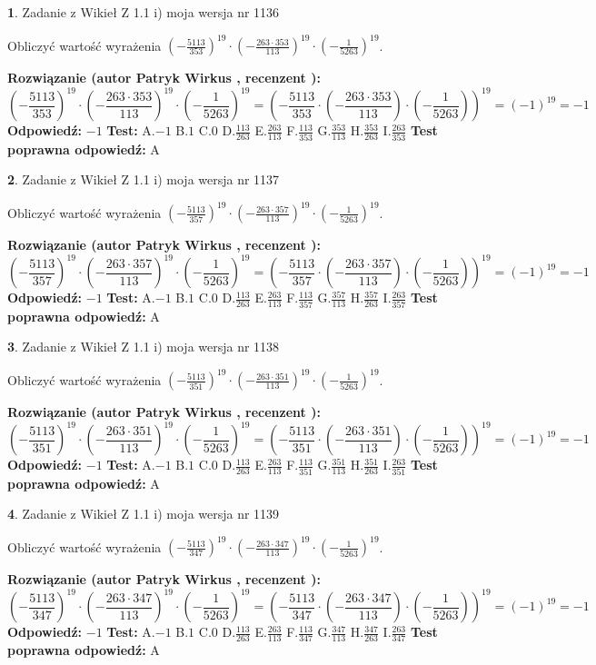 \documentclass[12pt, a4paper]{article}
\theoremstyle{definition} %
\newtheorem{zad}{}
\newcommand{\zadStart}[1]{\begin{zad}#1\newline}
\newcommand{\zadStop}{\end{zad}}
\newcommand{\rozwStart}[2]{\noindent \textbf{Rozwiązanie (autor #1 , recenzent #2): }\newline}
\newcommand{\rozwStop}{\newline}
\newcommand{\odpStart}{\noindent \textbf{Odpowiedź:}\newline}
\newcommand{\odpStop}{\newline}
\newcommand{\testStart}{\noindent \textbf{Test:}\newline}
\newcommand{\testStop}{\newline}
\newcommand{\kluczStart}{\noindent \textbf{Test poprawna odpowiedź:}\newline}
\newcommand{\kluczStop}{\newline}
\begin{document}
\zadStart{Zadanie z Wikieł Z 1.1 i) moja wersja nr 1136}

Obliczyć wartość wyrażenia $(-\frac{5113}{353})^{19} \cdot (-\frac{263 \cdot 353}{113})^{19} \cdot (-\frac{1}{5263})^{19}$.
\zadStop
\rozwStart{Patryk Wirkus}{}
$$(-\frac{5113}{353})^{19} \cdot (-\frac{263 \cdot 353}{113})^{19} \cdot (-\frac{1}{5263})^{19} = (-\frac{5113}{353} \cdot (-\frac{263 \cdot 353}{113}) \cdot (-\frac{1}{5263}))^{19} = (-1)^{19} = -1$$
\rozwStop
\odpStart
$-1$
\odpStop
\testStart
A.$-1$ B.$1$ C.$0$ D.$\frac{113}{263}$ E.$\frac{263}{113}$
F.$\frac{113}{353}$ G.$\frac{353}{113}$
H.$\frac{353}{263}$
I.$\frac{263}{353}$
\testStop
\kluczStart
A
\kluczStop



\zadStart{Zadanie z Wikieł Z 1.1 i) moja wersja nr 1137}

Obliczyć wartość wyrażenia $(-\frac{5113}{357})^{19} \cdot (-\frac{263 \cdot 357}{113})^{19} \cdot (-\frac{1}{5263})^{19}$.
\zadStop
\rozwStart{Patryk Wirkus}{}
$$(-\frac{5113}{357})^{19} \cdot (-\frac{263 \cdot 357}{113})^{19} \cdot (-\frac{1}{5263})^{19} = (-\frac{5113}{357} \cdot (-\frac{263 \cdot 357}{113}) \cdot (-\frac{1}{5263}))^{19} = (-1)^{19} = -1$$
\rozwStop
\odpStart
$-1$
\odpStop
\testStart
A.$-1$ B.$1$ C.$0$ D.$\frac{113}{263}$ E.$\frac{263}{113}$
F.$\frac{113}{357}$ G.$\frac{357}{113}$
H.$\frac{357}{263}$
I.$\frac{263}{357}$
\testStop
\kluczStart
A
\kluczStop



\zadStart{Zadanie z Wikieł Z 1.1 i) moja wersja nr 1138}

Obliczyć wartość wyrażenia $(-\frac{5113}{351})^{19} \cdot (-\frac{263 \cdot 351}{113})^{19} \cdot (-\frac{1}{5263})^{19}$.
\zadStop
\rozwStart{Patryk Wirkus}{}
$$(-\frac{5113}{351})^{19} \cdot (-\frac{263 \cdot 351}{113})^{19} \cdot (-\frac{1}{5263})^{19} = (-\frac{5113}{351} \cdot (-\frac{263 \cdot 351}{113}) \cdot (-\frac{1}{5263}))^{19} = (-1)^{19} = -1$$
\rozwStop
\odpStart
$-1$
\odpStop
\testStart
A.$-1$ B.$1$ C.$0$ D.$\frac{113}{263}$ E.$\frac{263}{113}$
F.$\frac{113}{351}$ G.$\frac{351}{113}$
H.$\frac{351}{263}$
I.$\frac{263}{351}$
\testStop
\kluczStart
A
\kluczStop



\zadStart{Zadanie z Wikieł Z 1.1 i) moja wersja nr 1139}

Obliczyć wartość wyrażenia $(-\frac{5113}{347})^{19} \cdot (-\frac{263 \cdot 347}{113})^{19} \cdot (-\frac{1}{5263})^{19}$.
\zadStop
\rozwStart{Patryk Wirkus}{}
$$(-\frac{5113}{347})^{19} \cdot (-\frac{263 \cdot 347}{113})^{19} \cdot (-\frac{1}{5263})^{19} = (-\frac{5113}{347} \cdot (-\frac{263 \cdot 347}{113}) \cdot (-\frac{1}{5263}))^{19} = (-1)^{19} = -1$$
\rozwStop
\odpStart
$-1$
\odpStop
\testStart
A.$-1$ B.$1$ C.$0$ D.$\frac{113}{263}$ E.$\frac{263}{113}$
F.$\frac{113}{347}$ G.$\frac{347}{113}$
H.$\frac{347}{263}$
I.$\frac{263}{347}$
\testStop
\kluczStart
A
\kluczStop
\end{document}
